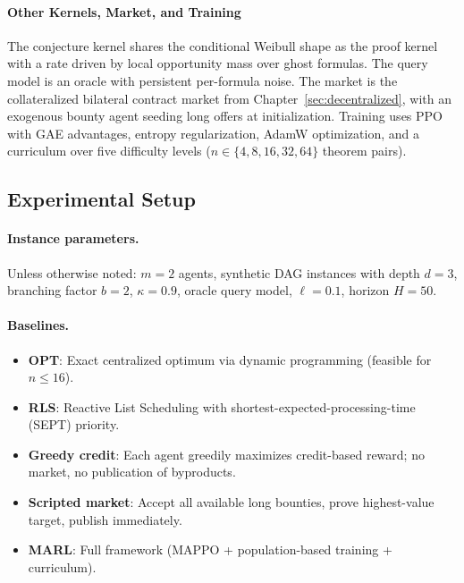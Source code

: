 \paragraph{Other Kernels, Market, and Training}

The conjecture kernel shares the conditional Weibull shape as the proof kernel with a rate driven by local opportunity mass over ghost formulas. The query model is an oracle with persistent per-formula noise. The market is the collateralized bilateral contract market from Chapter~\ref{sec:decentralized}, with an exogenous bounty agent seeding long offers at initialization. Training uses PPO with GAE advantages, entropy regularization, AdamW optimization, and a curriculum over five difficulty levels ($n \in \{4,8,16,32,64\}$ theorem pairs).


\subsection{Experimental Setup}\label{sec:exp-setup}

\paragraph{Instance parameters.}
Unless otherwise noted: $m=2$ agents, synthetic DAG instances with depth $d=3$, branching factor $b=2$, $\kappa=0.9$, oracle query model, $\ell = 0.1$, horizon $H=50$.

\paragraph{Baselines.}
\begin{itemize}
    \item \textbf{OPT}: Exact centralized optimum via dynamic programming (feasible for $n\le 16$).
    \item \textbf{RLS}: Reactive List Scheduling with shortest-expected-processing-time (SEPT) priority.
    \item \textbf{Greedy credit}: Each agent greedily maximizes credit-based reward; no market, no publication of byproducts.
    \item \textbf{Scripted market}: Accept all available long bounties, prove highest-value target, publish immediately.
    \item \textbf{MARL}: Full framework (MAPPO + population-based training + curriculum).
\end{itemize}

